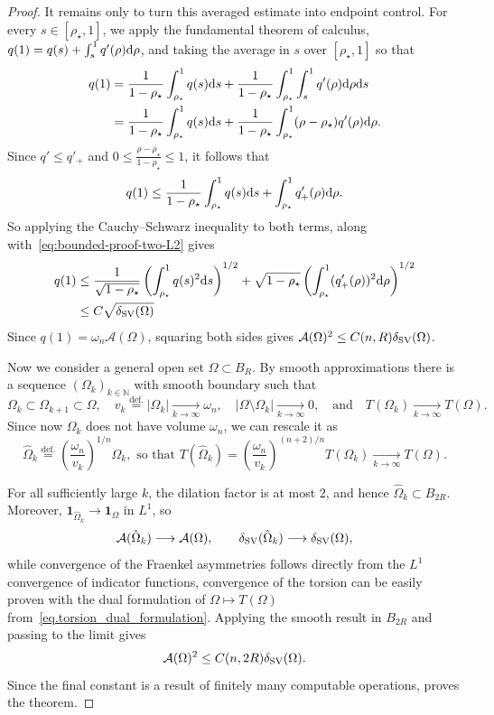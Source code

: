 \documentclass[11pt]{amsart}
\theoremstyle{plain}
\theoremstyle{definition}
\newcommand{\eqdef}{\overset{\text{def.}}{=}}
\def\dd{{\rm d}}
\newcommand\SV{\mathop{\rm SV}}
\begin{document}
\begin{proof}
It remains only to turn this averaged estimate into endpoint control. For every $s\in[\rho_\star,1]$, we apply the fundamental theorem of calculus, $q(1) =  q(s)+\int_s^1q'(\rho)\dd\rho$, and taking the average in $s$ over $[\rho_\star,1]$ so that
\begin{align*}
  q(1)
  &=
  \frac{1}{1-\rho_\star}\int_{\rho_\star}^1 q(s)\dd s
  +
  \frac{1}{1-\rho_\star}
  \int_{\rho_\star}^1\int_s^1 q'(\rho)\dd \rho\dd s\\
  &=
  \frac{1}{1-\rho_\star}\int_{\rho_\star}^1 q(s)\dd s
  +
  \frac{1}{1-\rho_\star}
  \int_{\rho_\star}^1
  (\rho-\rho_\star)q'(\rho)\dd\rho.
\end{align*}
Since $q'\le q'_+$ and
$0\le \frac{\rho-\rho_\star}{1-\rho_\star}\le 1$, it follows that
\[
q(1)
\le
\frac{1}{1-\rho_\star}\int_{\rho_\star}^1 q(s)\dd s
+
\int_{\rho_\star}^1 q'_+(\rho)\dd \rho.
\]
So applying the Cauchy--Schwarz inequality to both terms, along with~\eqref{eq:bounded-proof-two-L2} gives
\begin{align*}
q(1)
&\le
\frac{1}{\sqrt{1-\rho_\star}}
\left(\int_{\rho_\star}^1 q(s)^2\dd s\right)^{1/2}
+
\sqrt{1-\rho_\star}
\left(\int_{\rho_\star}^1 (q'_+(\rho))^2\dd\rho\right)^{1/2}\\
&\le
C\sqrt{\delta_{\mathrm{SV}}(\Omega)}
\end{align*}
Since $q(1)=\omega_n\mathcal{A}(\Omega)$, squaring both sides gives
$\mathcal{A}(\Omega)^2\le C(n,R)\delta_{\SV}(\Omega)$.

Now we consider a general open set $\Omega \subset B_R$. By smooth approximations there is a sequence ${(\Omega_k)}_{k \in \mathbb{N}}$ with smooth boundary such that
\[
    \Omega_k \subset \Omega_{k + 1} \subset \Omega, \quad
    v_k \eqdef |\Omega_k|  \xrightarrow[k \to \infty]{} \omega_n, \quad
    |\Omega \setminus \Omega_k|  \xrightarrow[k \to \infty]{} 0, \quad
    \text{and} \quad
    T(\Omega_k)  \xrightarrow[k \to \infty]{} T(\Omega).
\]
Since now $\Omega_k$ does not have volume $\omega_n$, we can rescale it as
\[
    \hat \Omega_k
    \eqdef
    {\left(\frac{\omega_n}{v_k}\right)}^{1/n} \Omega_k, \text{ so that }
    T(\hat \Omega_k)
    =
    {\left(\frac{\omega_n}{v_k}\right)}^{(n+2)/n} T(\Omega_k)
    \xrightarrow[k \to \infty]{}
    T(\Omega).
\]

For all sufficiently large $k$, the dilation factor is at most $2$, and hence
$\hat\Omega_k\subset B_{2R}$. Moreover,
$\mathbf1_{\hat\Omega_k}\to\mathbf1_\Omega$ in $L^1$, so
\[
 \mathcal A(\hat\Omega_k)\longrightarrow\mathcal A(\Omega),
 \qquad
 \delta_{\rm SV}(\hat\Omega_k)\longrightarrow\delta_{\rm SV}(\Omega),
\]
while convergence of the Fraenkel asymmetries follows directly from the $L^1$ convergence of indicator functions, convergence of the torsion can be easily proven with the dual formulation of $\Omega \mapsto T(\Omega)$ from~\eqref{eq.torsion_dual_formulation}. Applying the smooth result in $B_{2R}$ and passing to the limit
gives
\[
 \mathcal A(\Omega)^2\le C(n,2R)\delta_{\rm SV}(\Omega).
\]
Since the final constant is a result of finitely many computable operations, proves the theorem.
\end{proof}
\end{document}
